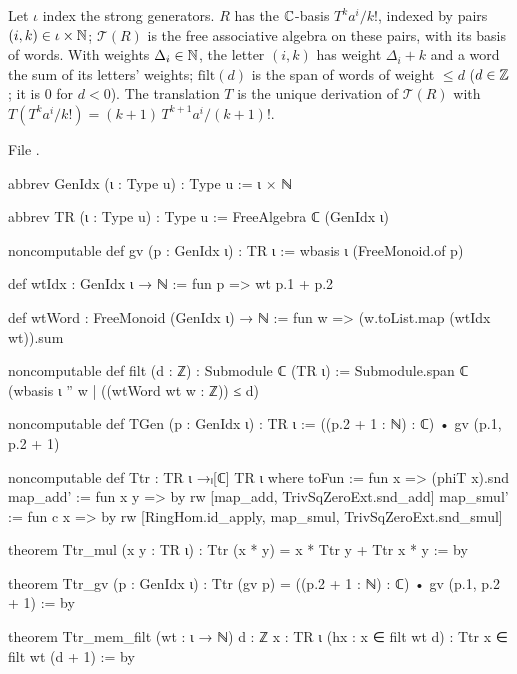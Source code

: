 \begin{definition}\label{l11:def:TR}
Let $\iota$ index the strong generators. $R$ has the ${\mathbb{C}}$-basis $T^ka^i/k!$, indexed by pairs $(i,k)\in\iota\times{\mathbb{N}}$;
$\mathcal T(R)$ is the free associative algebra on these pairs, with its basis of words. With weights $\Delta_i\in{\mathbb{N}}$,
the letter $(i,k)$ has weight $\Delta_i+k$ and a word the sum of its letters' weights; $\mathrm{filt}(d)$ is the span of words
of weight $\le d$ ($d\in{\mathbb{Z}}$; it is $0$ for $d<0$). The translation $T$ is the unique derivation of $\mathcal T(R)$ with
$T(T^ka^i/k!) = (k+1)\,T^{k+1}a^i/(k+1)!$.
\end{definition}
\noindent File .
\begin{leancode}
abbrev GenIdx (ι : Type u) : Type u := ι × ℕ

abbrev TR (ι : Type u) : Type u := FreeAlgebra ℂ (GenIdx ι)

noncomputable def gv (p : GenIdx ι) : TR ι := wbasis ι (FreeMonoid.of p)

def wtIdx : GenIdx ι → ℕ := fun p => wt p.1 + p.2

def wtWord : FreeMonoid (GenIdx ι) → ℕ := fun w => (w.toList.map (wtIdx wt)).sum

noncomputable def filt (d : ℤ) : Submodule ℂ (TR ι) :=
  Submodule.span ℂ (wbasis ι '' {w | ((wtWord wt w : ℤ)) ≤ d})

noncomputable def TGen (p : GenIdx ι) : TR ι := ((p.2 + 1 : ℕ) : ℂ) • gv (p.1, p.2 + 1)

noncomputable def Ttr : TR ι →ₗ[ℂ] TR ι where
  toFun := fun x => (phiT x).snd
  map_add' := fun x y => by rw [map_add, TrivSqZeroExt.snd_add]
  map_smul' := fun c x => by rw [RingHom.id_apply, map_smul, TrivSqZeroExt.snd_smul]

theorem Ttr_mul (x y : TR ι) : Ttr (x * y) = x * Ttr y + Ttr x * y := by

theorem Ttr_gv (p : GenIdx ι) : Ttr (gv p) = ((p.2 + 1 : ℕ) : ℂ) • gv (p.1, p.2 + 1) := by

theorem Ttr_mem_filt (wt : ι → ℕ) {d : ℤ} {x : TR ι} (hx : x ∈ filt wt d) :
    Ttr x ∈ filt wt (d + 1) := by
\end{leancode}

